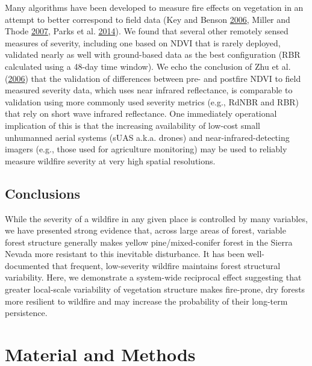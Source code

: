 \documentclass[twoside,12pt,final]{ucthesis-CA2012}
\begin{document}
\begin{ucmainmatter}
Many algorithms have been developed to measure fire effects on
vegetation in an attempt to better correspond to field data (Key and
Benson \protect\hyperlink{ref-key2006}{2006}, Miller and Thode
\protect\hyperlink{ref-miller2007}{2007}, Parks et al.
\protect\hyperlink{ref-parks2014a}{2014}). We found that several other
remotely sensed measures of severity, including one based on NDVI that
is rarely deployed, validated nearly as well with ground-based data as
the best configuration (RBR calculated using a 48-day time window). We
echo the conclusion of Zhu et al.
(\protect\hyperlink{ref-zhu2006}{2006}) that the validation of
differences between pre- and postfire NDVI to field measured severity
data, which uses near infrared reflectance, is comparable to validation
using more commonly used severity metrics (e.g., RdNBR and RBR) that
rely on short wave infrared reflectance. One immediately operational
implication of this is that the increasing availability of low-cost
small unhumanned aerial systems (sUAS a.k.a. drones) and
near-infrared-detecting imagers (e.g., those used for agriculture
monitoring) may be used to reliably measure wildfire severity at very
high spatial resolutions.

\subsection{Conclusions}\label{conclusions}

While the severity of a wildfire in any given place is controlled by
many variables, we have presented strong evidence that, across large
areas of forest, variable forest structure generally makes yellow
pine/mixed-conifer forest in the Sierra Nevada more resistant to this
inevitable disturbance. It has been well-documented that frequent,
low-severity wildfire maintains forest structural variability. Here, we
demonstrate a system-wide reciprocal effect suggesting that greater
local-scale variability of vegetation structure makes fire-prone, dry
forests more resilient to wildfire and may increase the probability of
their long-term persistence.

\section{Material and Methods}\label{material-and-methods}


\end{ucmainmatter}
\end{document}
